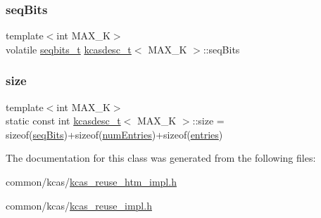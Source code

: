 \subsubsection{\texorpdfstring{seq\+Bits}{seqBits}}
{\footnotesize\ttfamily template$<$int M\+A\+X\+\_\+K$>$ \\
volatile \hyperlink{kcas__reuse__htm__impl_8h_a997daf56279be481f5c4294647725689}{seqbits\+\_\+t} \hyperlink{classkcasdesc__t}{kcasdesc\+\_\+t}$<$ M\+A\+X\+\_\+K $>$\+::seq\+Bits}

\mbox{\label{classkcasdesc__t_a9cace636d1135fde7fb97772e470dbd4}} 
\subsubsection{\texorpdfstring{size}{size}}
{\footnotesize\ttfamily template$<$int M\+A\+X\+\_\+K$>$ \\
static const int \hyperlink{classkcasdesc__t}{kcasdesc\+\_\+t}$<$ M\+A\+X\+\_\+K $>$\+::size = sizeof(\hyperlink{classkcasdesc__t_aed9ffdbc7a72d10a886e662fb82b26df}{seq\+Bits})+sizeof(\hyperlink{classkcasdesc__t_a841071a61ea7238f822e1fc644111380}{num\+Entries})+sizeof(\hyperlink{classkcasdesc__t_adb510f640c081f2550c92f0978d74329}{entries})\hspace{0.3cm}{\ttfamily [static]}}



The documentation for this class was generated from the following files\+:\begin{DoxyCompactItemize}
\item 
common/kcas/\hyperlink{kcas__reuse__htm__impl_8h}{kcas\+\_\+reuse\+\_\+htm\+\_\+impl.\+h}\item 
common/kcas/\hyperlink{kcas__reuse__impl_8h}{kcas\+\_\+reuse\+\_\+impl.\+h}\end{DoxyCompactItemize}
